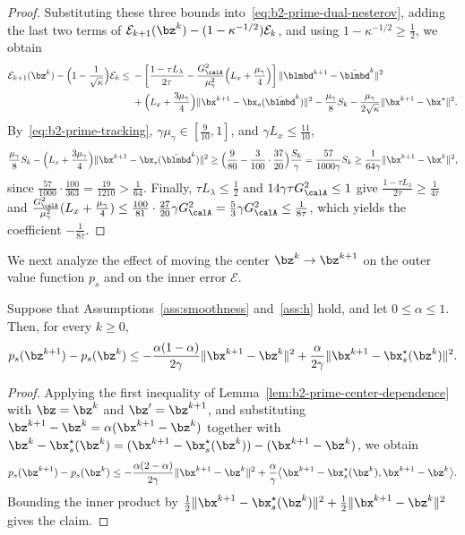 \begin{proof}
Substituting these three bounds into~\eqref{eq:b2-prime-dual-nesterov}, adding
the last two terms of
\(\mathcal E_{k+1}(\bz^k)-(1-\kappa^{-1/2})\mathcal E_k\), and using
\(1-\kappa^{-1/2}\ge\frac12\), we obtain
\[
\begin{aligned}
    \mathcal E_{k+1}(\bz^k)-\Bigl(1-\frac{1}{\sqrt{\kappa}}\Bigr)\mathcal E_k
    \le{}&-\left[\frac{1-\tau L_\lambda}{2\tau}
    -\frac{G_{\calA}^2}{\mu_\gamma^2}
    \Bigl(L_x+\frac{\mu_\gamma}{4}\Bigr)\right]
    \|\blmbd^{k+1}-\bar{\blmbd}^k\|^2\\
    &+\Bigl(L_x+\frac{3\mu_\gamma}{4}\Bigr)
    \|\bx^{k+1}-\bx_s(\bar{\blmbd}^k)\|^2
    -\frac{\mu_\gamma}{8}S_k
    -\frac{\mu_\gamma}{2\sqrt{\kappa}}\|\bx^{k+1}-\bx^\star\|^2 .
\end{aligned}
\]
By~\eqref{eq:b2-prime-tracking}, \(\gamma\mu_\gamma\in[\frac{9}{10},1]\), and
\(\gamma L_x\le\frac{11}{10}\),
\[
    \frac{\mu_\gamma}{8}S_k
    -\Bigl(L_x+\frac{3\mu_\gamma}{4}\Bigr)\|\bx^{k+1}-\bx_s(\bar{\blmbd}^k)\|^2
    \ge\Bigl(\frac{9}{80}-\frac{3}{100}\cdot\frac{37}{20}\Bigr)\frac{S_k}{\gamma}
    =\frac{57}{1000\gamma}S_k
    \ge\frac{1}{64\gamma}\|\bx^{k+1}-\bx^k\|^2,
\]
since \(\frac{57}{1000}\cdot\frac{100}{363}=\frac{19}{1210}>\frac{1}{64}\).
Finally, \(\tau L_\lambda\le\frac12\) and \(14\gamma\tau G_{\calA}^2\le1\) give
\(\frac{1-\tau L_\lambda}{2\tau}\ge\frac{1}{4\tau}\) and
\(\frac{G_{\calA}^2}{\mu_\gamma^2}(L_x+\frac{\mu_\gamma}{4})
\le\frac{100}{81}\cdot\frac{27}{20}\gamma G_{\calA}^2
=\frac53\gamma G_{\calA}^2\le\frac{1}{8\tau}\), which yields the coefficient
\(-\frac{1}{8\tau}\).
\end{proof}

We next analyze the effect of moving the center \(\bz^k\to\bz^{k+1}\) on the
outer value function \(p_s\) and on the inner error \(\mathcal E\).

\begin{lemma}
\label{lem:b2-prime-z-step-p}
Suppose that Assumptions~\ref{ass:smoothness} and~\ref{ass:h} hold, and let
\(0\le\alpha\le1\). Then, for every \(k\ge0\),
\[
    p_s(\bz^{k+1})-p_s(\bz^k)
    \le-\frac{\alpha(1-\alpha)}{2\gamma}\|\bx^{k+1}-\bz^k\|^2
    +\frac{\alpha}{2\gamma}\|\bx^{k+1}-\bx_s^\star(\bz^k)\|^2 .
\]
\end{lemma}

\begin{proof}
Applying the first inequality of Lemma~\ref{lem:b2-prime-center-dependence}
with \(\bz=\bz^k\) and \(\bz'=\bz^{k+1}\), and substituting
\(\bz^{k+1}-\bz^k=\alpha(\bx^{k+1}-\bz^k)\) together with
\(\bz^k-\bx_s^\star(\bz^k)
=(\bx^{k+1}-\bx_s^\star(\bz^k))-(\bx^{k+1}-\bz^k)\), we obtain
\[
    p_s(\bz^{k+1})-p_s(\bz^k)
    \le-\frac{\alpha(2-\alpha)}{2\gamma}\|\bx^{k+1}-\bz^k\|^2
    +\frac{\alpha}{\gamma}\bigl\langle\bx^{k+1}-\bx_s^\star(\bz^k),
    \bx^{k+1}-\bz^k\bigr\rangle .
\]
Bounding the inner product by
\(\frac12\|\bx^{k+1}-\bx_s^\star(\bz^k)\|^2+\frac12\|\bx^{k+1}-\bz^k\|^2\)
gives the claim.
\end{proof}

